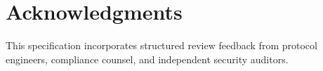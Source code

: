 \section*{Acknowledgments}


This specification incorporates structured review feedback from protocol engineers, compliance counsel, and independent security auditors.

